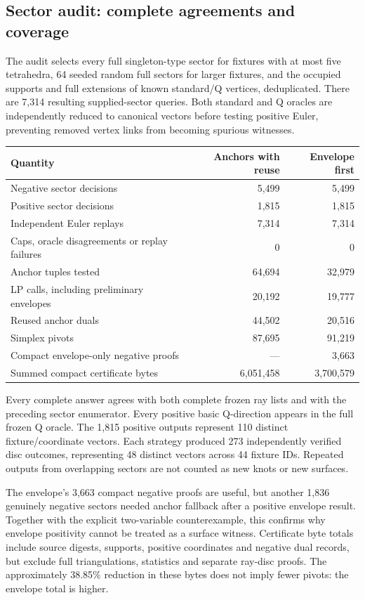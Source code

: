 \subsection{Sector audit: complete agreements and coverage}

The audit selects every full singleton-type sector for fixtures with at most five tetrahedra, 64 seeded random full sectors for larger fixtures, and the occupied supports and full extensions of known standard/Q vertices, deduplicated. There are 7,314 resulting supplied-sector queries. Both standard and Q oracles are independently reduced to canonical vectors before testing positive Euler, preventing removed vertex links from becoming spurious witnesses.

\begin{center}\small
\begin{tabular}{@{}lrr@{}}
\toprule
Quantity & Anchors with reuse & Envelope first\\
\midrule
Negative sector decisions & 5,499 & 5,499\\
Positive sector decisions & 1,815 & 1,815\\
Independent Euler replays & 7,314 & 7,314\\
Caps, oracle disagreements or replay failures & 0 & 0\\
Anchor tuples tested & 64,694 & 32,979\\
LP calls, including preliminary envelopes & 20,192 & 19,777\\
Reused anchor duals & 44,502 & 20,516\\
Simplex pivots & 87,695 & 91,219\\
Compact envelope-only negative proofs & --- & 3,663\\
Summed compact certificate bytes & 6,051,458 & 3,700,579\\
\bottomrule
\end{tabular}
\end{center}

Every complete answer agrees with both complete frozen ray lists and with the preceding sector enumerator. Every positive basic Q-direction appears in the full frozen Q oracle. The 1,815 positive outputs represent 110 distinct fixture/coordinate vectors. Each strategy produced 273 independently verified disc outcomes, representing 48 distinct vectors across 44 fixture IDs. Repeated outputs from overlapping sectors are not counted as new knots or new surfaces.

The envelope's 3,663 compact negative proofs are useful, but another 1,836 genuinely negative sectors needed anchor fallback after a positive envelope result. Together with the explicit two-variable counterexample, this confirms why envelope positivity cannot be treated as a surface witness. Certificate byte totals include source digests, supports, positive coordinates and negative dual records, but exclude full triangulations, statistics and separate ray-disc proofs. The approximately 38.85\% reduction in these bytes does not imply fewer pivots: the envelope total is higher.

